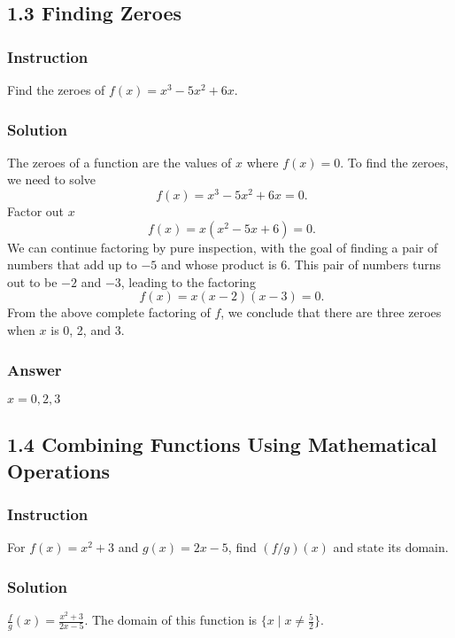 \documentclass[12pt, letterpaper, oneside]{memoir}
\begin{document}
\subsection*{1.3 Finding Zeroes}

\subsubsection*{Instruction}

Find the zeroes of $ f(x) = x^3 - 5x^2 + 6x $.

\subsubsection*{Solution}

The zeroes of a function are the values of $ x $ where $ f(x) = 0 $. To find the zeroes, we need to solve
$$ \phantom{.}
f(x) = x^3 - 5x^2 + 6x = 0
.$$
Factor out $ x $
$$ \phantom{.}
f(x) = x(x^2 - 5x + 6) = 0
.$$
We can continue factoring by pure inspection, with the goal of finding a pair of numbers that add up to $ -5 $ and whose product is $ 6 $. This pair of numbers turns out to be $ -2 $ and $ - 3 $, leading to the factoring
$$ \phantom{.}
f(x) = x(x - 2)(x - 3) = 0
.$$
From the above complete factoring of $ f $, we conclude that there are three zeroes when $ x $ is 0, 2, and 3.

\subsubsection{Answer}

$ x = 0, 2, 3 $

\subsection*{1.4 Combining Functions Using Mathematical Operations}

\subsubsection{Instruction}

For $ f(x) = x^2 + 3 $ and $ g(x) = 2x - 5 $, find $ (f/g)(x) $ and state its domain.

\subsubsection{Solution}

$ \frac{f}{g}(x) = \frac{x^2 + 3}{2x - 5} $. The domain of this function is $ \{ x \mid x \ne \frac{5}{2} \} $.
\end{document}
